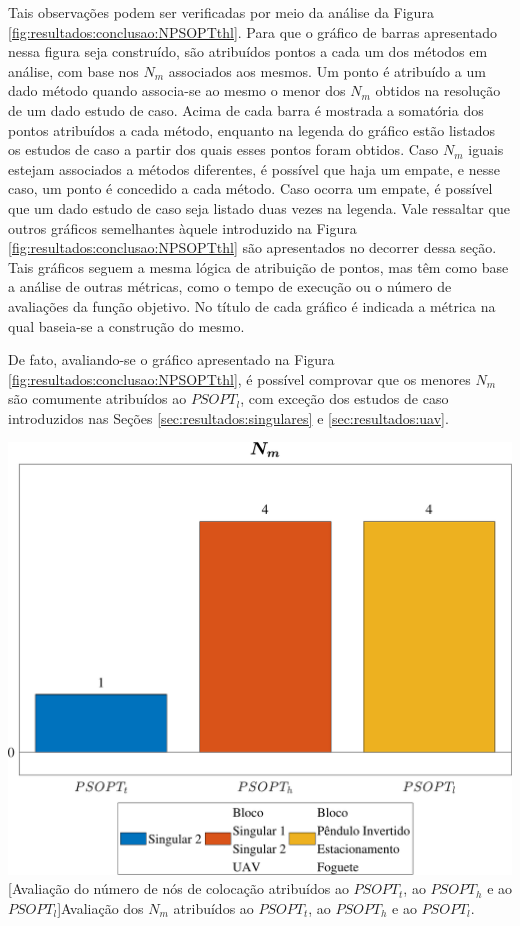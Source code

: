 Tais observações podem ser verificadas por meio da análise da Figura \ref{fig:resultados:conclusao:NPSOPTthl}. Para que o gráfico de barras apresentado nessa figura seja construído, são atribuídos pontos a cada um dos métodos em análise, com base nos $ N_m $ associados aos mesmos. Um ponto é atribuído a um dado método quando associa-se ao mesmo o menor dos $ N_m $ obtidos na resolução de um dado estudo de caso. Acima de cada barra é mostrada a somatória dos pontos atribuídos a cada método, enquanto na legenda do gráfico estão listados os estudos de caso a partir dos quais esses pontos foram obtidos. Caso $ N_m $ iguais estejam associados a métodos diferentes, é possível que haja um empate, e nesse caso, um ponto é concedido a cada método. Caso ocorra um empate, é possível que um dado estudo de caso seja listado duas vezes na legenda. Vale ressaltar que outros gráficos semelhantes àquele introduzido na Figura \ref{fig:resultados:conclusao:NPSOPTthl} são apresentados no decorrer dessa seção. Tais gráficos seguem a mesma lógica de atribuição de pontos, mas têm como base a análise de outras métricas, como o tempo de execução ou o número de avaliações da função objetivo. No título de cada gráfico é indicada a métrica na qual baseia-se a construção do mesmo.

De fato, avaliando-se o gráfico apresentado na Figura \ref{fig:resultados:conclusao:NPSOPTthl}, é possível comprovar que os menores $ N_m $ são comumente atribuídos ao $ PSOPT_l $, com exceção dos estudos de caso introduzidos nas Seções \ref{sec:resultados:singulares} e \ref{sec:resultados:uav}.

\noindent	
\begin{minipage}{\textwidth}
	\vspace{\onelineskip}
	\centering
	\includegraphics[width=1\linewidth]{fig/resultados/ranking/3/N}
	[Avaliação do número de nós de colocação atribuídos ao $ PSOPT_t $, ao $ PSOPT_h $ e ao $ PSOPT_l $]{Avaliação dos $ N_m $ atribuídos ao $ PSOPT_t $, ao $ PSOPT_h $ e ao $ PSOPT_l $.}
	\label{fig:resultados:conclusao:NPSOPTthl}
	\vspace{\onelineskip}
\end{minipage}

